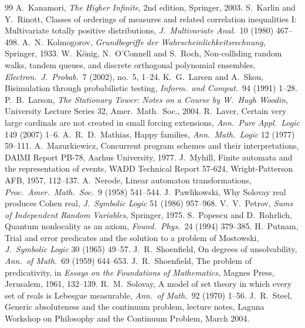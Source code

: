 \documentclass[11pt]{article}
\theoremstyle{definition}
\theoremstyle{remark}
\begin{document}
\begin{thebibliography}{99}
 A.~Kanamori, \emph{The Higher Infinite}, 2nd edition, Springer, 2003.
 S.~Karlin and Y.~Rinott, Classes of orderings of measures and related correlation inequalities I: Multivariate totally positive distributions, \emph{J.\ Multivariate Anal.}\ 10 (1980) 467--498.
 A.~N.~Kolmogorov, \emph{Grundbegriffe der Wahrscheinlichkeitsrechnung}, Springer, 1933.
 W.~K\"onig, N.~O'Connell and S.~Roch, Non-colliding random walks, tandem queues, and discrete orthogonal polynomial ensembles, \emph{Electron.\ J.\ Probab.}\ 7 (2002), no.~5, 1--24.
 K.~G.~Larsen and A.~Skou, Bisimulation through probabilistic testing, \emph{Inform.\ and Comput.}\ 94 (1991) 1--28.
 P.~B.~Larson, \emph{The Stationary Tower: Notes on a Course by W.~Hugh Woodin}, University Lecture Series 32, Amer.\ Math.\ Soc., 2004.
 R.~Laver, Certain very large cardinals are not created in small forcing extensions, \emph{Ann.\ Pure Appl.\ Logic} 149 (2007) 1--6.
 A.~R.~D.~Mathias, Happy families, \emph{Ann.\ Math.\ Logic} 12 (1977) 59--111.
 A.~Mazurkiewicz, Concurrent program schemes and their interpretations, DAIMI Report PB-78, Aarhus University, 1977.
 J.~Myhill, Finite automata and the representation of events, WADD Technical Report 57-624, Wright-Patterson AFB, 1957, 112--137.
 A.~Nerode, Linear automaton transformations, \emph{Proc.\ Amer.\ Math.\ Soc.}\ 9 (1958) 541--544.
 J.~Pawlikowski, Why Solovay real produces Cohen real, \emph{J.\ Symbolic Logic} 51 (1986) 957--968.
 V.~V.~Petrov, \emph{Sums of Independent Random Variables}, Springer, 1975.
 S.~Popescu and D.~Rohrlich, Quantum nonlocality as an axiom, \emph{Found.\ Phys.}\ 24 (1994) 379--385.
 H.~Putnam, Trial and error predicates and the solution to a problem of Mostowski, \emph{J.\ Symbolic Logic} 30 (1965) 49--57.
 J.~R.~Shoenfield, On degrees of unsolvability, \emph{Ann.\ of Math.}\ 69 (1959) 644--653.
 J.~R.~Shoenfield, The problem of predicativity, in \emph{Essays on the Foundations of Mathematics}, Magnes Press, Jerusalem, 1961, 132--139.
 R.~M.~Solovay, A model of set theory in which every set of reals is Lebesgue measurable, \emph{Ann.\ of Math.}\ 92 (1970) 1--56.
 J.~R.~Steel, Generic absoluteness and the continuum problem, lecture notes, Laguna Workshop on Philosophy and the Continuum Problem, March 2004.

\end{thebibliography}
\end{document}
